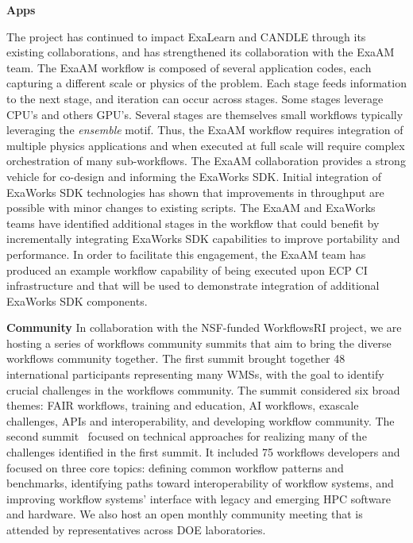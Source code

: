 \textbf{Apps}

The project has continued to impact ExaLearn and CANDLE through its existing
collaborations, and has strengthened its collaboration with the ExaAM team. The
ExaAM workflow is composed of several application codes, each capturing a
different scale or physics of the problem.  Each stage feeds
information to the next stage, and iteration can occur across stages.  Some
stages leverage CPU's and others GPU's. Several stages are themselves small
workflows typically leveraging the \textit{ensemble} motif. Thus, the ExaAM
workflow requires integration of multiple physics applications and when
executed at full scale will require complex orchestration of many
sub-workflows.  The ExaAM collaboration provides a strong vehicle for co-design and informing the 
ExaWorks SDK. Initial integration of ExaWorks SDK technologies has shown that
improvements in throughput are possible with minor changes to existing scripts.
The ExaAM and ExaWorks teams have identified additional stages in the workflow
that could benefit by incrementally integrating ExaWorks SDK capabilities to
improve portability and performance.  In order to facilitate this engagement,
the ExaAM team has produced an example workflow capability of being executed
upon ECP CI infrastructure and that will be used to demonstrate integration of additional
ExaWorks SDK components.

\textbf{Community}
In collaboration with the NSF-funded WorkflowsRI project, we are hosting
a series of workflows community summits that aim to bring the diverse
workflows community together. 
The first summit brought together 48 international participants representing many WMSs, 
with the goal to identify crucial challenges in the workflows community. 
The summit considered six broad themes: FAIR workflows, training and education,
AI workflows, exascale challenges, APIs and interoperability, and developing workflow community. 
The second summit~\cite{summit_2} focused on technical approaches for realizing 
many of the challenges identified in the first summit. It included 75 workflows developers %
and focused on three core topics: 
defining common workflow patterns and benchmarks, identifying paths toward interoperability of workflow systems, and improving workflow systems’ interface with legacy and emerging HPC software and hardware.
We also host an open monthly community meeting that is attended by representatives across
DOE laboratories.




